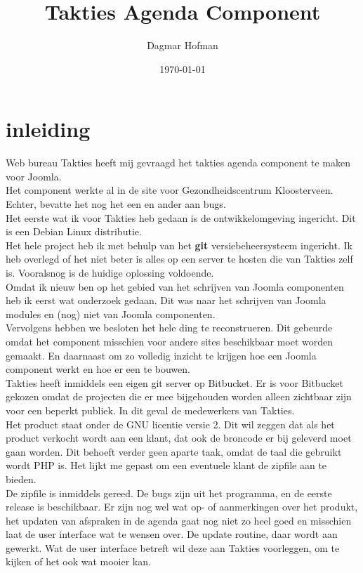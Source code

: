 \documentclass{article}
\title{ Takties Agenda Component  }
\author{ Dagmar Hofman  }
\date{ \today }
\begin{document}
\maketitle
{}

\newpage
\tableofcontents

\newpage
\section{inleiding}

Web bureau Takties heeft mij gevraagd het takties agenda component te maken voor Joomla. \\
Het component werkte al in de site voor Gezondheidscentrum Kloosterveen. Echter, bevatte het nog het een en ander aan bugs. \\
Het eerste wat ik voor Takties heb gedaan is de ontwikkelomgeving ingericht. Dit is een Debian Linux distributie. \\
Het hele project heb ik met behulp van het \textbf{git} versiebeheersysteem ingericht. Ik heb overlegd of het niet beter is alles op een server te hosten die van Takties zelf is. Vooralsnog is de huidige oplossing voldoende. \\
Omdat ik nieuw ben op het gebied van het schrijven van Joomla componenten heb ik eerst wat onderzoek gedaan. Dit was naar het schrijven van Joomla modules en (nog) niet van Joomla componenten. \\
Vervolgens hebben we besloten het hele ding te reconstrueren. Dit gebeurde omdat het component misschien voor andere sites beschikbaar moet worden gemaakt. En daarnaast om zo volledig inzicht te krijgen hoe een Joomla component werkt en hoe er een te bouwen. \\
Takties heeft inmiddels een eigen git server op Bitbucket. Er is voor Bitbucket gekozen omdat de projecten die er mee bijgehouden worden alleen zichtbaar zijn voor een beperkt publiek. In dit geval de medewerkers van Takties.\\
Het product staat onder de GNU licentie versie 2. Dit wil zeggen dat als het product verkocht wordt aan een klant, dat ook de broncode er bij geleverd moet gaan worden. Dit behoeft verder geen aparte taak, omdat de taal die gebruikt wordt PHP is. Het lijkt me gepast om een eventuele klant de zipfile aan te bieden. \\
De zipfile is inmiddels gereed. De bugs zijn uit het programma, en de eerste release is beschikbaar. Er zijn nog wel wat op- of aanmerkingen over het produkt, het updaten van afspraken in de agenda gaat nog niet zo heel goed en misschien laat de user interface wat te wensen over. De update routine, daar wordt aan gewerkt. Wat de user interface betreft wil deze aan Takties voorleggen, om te kijken of het ook wat mooier kan. \\
\end{document}
